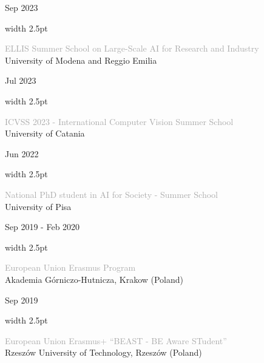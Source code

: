 \documentclass[10pt,a4paper]{article}
\newcommand{\cvsection}[1]{
    \vspace{2.2ex}
    \noindent{\Large \textcolor{darkgray}{#1}}
    \vspace{0.8ex}\par
}
\newcommand{\cventry}[3]{
    \par\noindent
    \begin{minipage}[t]{0.19\textwidth}
        \raggedleft \footnotesize \textcolor{textgray}{#2}
    \end{minipage}%
    \hspace{0.015\textwidth}%
    \textcolor{#1}{\vrule width 2.5pt}%
    \hspace{0.015\textwidth}%
    \begin{minipage}[t]{0.75\textwidth}
        \footnotesize #3
    \end{minipage}
    \par\vspace{0.6ex}
}
\begin{document}
\cvsection{Studies and Training Experiences}

\cventry{stu1}{Sep 2023}{\textcolor{darkgray}{ELLIS Summer School on Large-Scale AI for Research and Industry} \\ \textcolor{textgray}{University of Modena and Reggio Emilia}}

\cventry{stu1}{Jul 2023}{\textcolor{darkgray}{ICVSS 2023 - International Computer Vision Summer School} \\ \textcolor{textgray}{University of Catania}}

\cventry{stu2}{Jun 2022}{\textcolor{darkgray}{National PhD student in AI for Society - Summer School} \\ \textcolor{textgray}{University of Pisa}}

\cventry{stu3}{Sep 2019 - Feb 2020}{\textcolor{darkgray}{European Union Erasmus Program} \\ \textcolor{textgray}{Akademia Górniczo-Hutnicza, Krakow (Poland)}}

\cventry{stu3}{Sep 2019}{\textcolor{darkgray}{European Union Erasmus+ “BEAST - BE Aware STudent”} \\ \textcolor{textgray}{Rzeszów University of Technology, Rzeszów (Poland)}}
\end{document}
